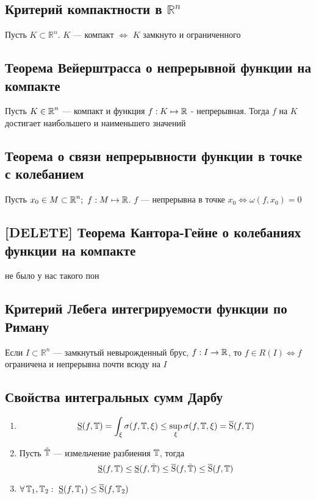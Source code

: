 \documentclass[a4paper]{article}
\begin{document}
\subsection{Критерий компактности в $\mathbb{R}^n$}
\theorem Пусть $K\subset \mathbb{R}^n$. $K$ — компакт $\Longleftrightarrow$ $K$ замкнуто и ограниченного

\subsection{Теорема Вейерштрасса о непрерывной функции на компакте}
\theorem Пусть $K\in \operatorname{\mathbb{R}}^n$ — компакт и функция $f: K\mapsto \operatorname{\mathbb{R}}$ - непрерывная. Тогда $f$ на $K$ достигает наибольшего и наименьшего значений

\subsection{Теорема о связи непрерывности функции в точке с колебанием}
\theorem Пусть $x_0 \in M \subset \operatorname{\mathbb{R}}^n; \,\, f: M\mapsto\operatorname{\mathbb{R}}$. $f$ — непрерывна в точке $x_0 \iff \omega(f, x_0) = 0$

\subsection{[DELETE] Теорема Кантора-Гейне о колебаниях функции на компакте}
не было у нас такого пон

\subsection{Критерий Лебега интегрируемости функции по Риману}
\theorem Если $I\subset \mathbb{R}^n$ — замкнутый невырожденный брус, $f: I\to\operatorname{\mathbb{R}}$, то $f\in R(I) \iff f$ ограничена и непрерывна почти всюду на $I$

\subsection{Свойства интегральных сумм Дарбу}
\begin{enumerate}
    \item \begin{equation*}
        \operatorname{\underline{S}}(f, \operatorname{\mathbb{T}}) = \int_{\xi}\sigma(f, \operatorname{\mathbb{T}}, \xi) \le \sup_{\xi}\sigma(f, \operatorname{\mathbb{T}}, \xi) = \operatorname{\overline{S}}(f, \operatorname{\mathbb{T}})
    \end{equation*}

    \item Пусть $\tilde{\operatorname{\mathbb{T}}}$ — измельчение разбиения $\operatorname{\mathbb{T}}$, тогда
    \begin{equation*}
        \operatorname{\underline{S}}(f, \operatorname{\mathbb{T}}) \le \operatorname{\underline{S}}(f, \tilde{\operatorname{\mathbb{T}}}) \le \operatorname{\overline{S}}(f, \tilde{\operatorname{\mathbb{T}}}) \le \operatorname{\overline{S}}(f, \operatorname{\mathbb{T}})
    \end{equation*}

    \item $\forall \operatorname{\mathbb{T}}_1, \operatorname{\mathbb{T}}_2:\ \operatorname{\underline{S}}(f, \operatorname{\mathbb{T}}_1) \le \operatorname{\overline{S}}(f, \operatorname{\mathbb{T}}_2)$
\end{enumerate}
\end{document}
